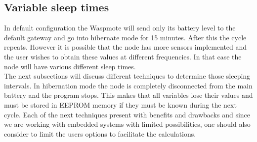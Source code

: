 \subsection{Variable sleep times}
In default configuration the Waspmote will send only its battery level to the default gateway and go into hibernate mode for 15 minutes. After this the cycle repeats. However it is possible that the node has more sensors implemented and the user wishes to obtain these values at different frequencies. In that case the node will have various different sleep times. \\
The next subsections will discuss different techniques to determine those sleeping intervals. In hibernation mode the node is completely disconnected from the main battery and the program stops. This makes that all variables lose their values and must be stored in EEPROM memory if they must be known during the next cycle. Each of the next techniques present with benefits and drawbacks and since we are working with embedded systems with limited possibilities, one should also consider to limit the users options to facilitate the calculations.
